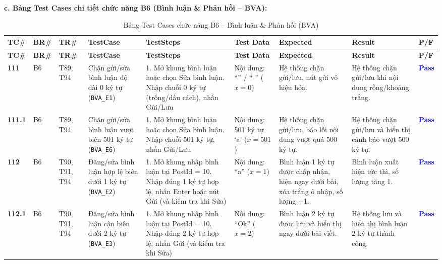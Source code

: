 \documentclass[11pt,a4paper]{article}
\begin{document}
\noindent\textbf{c. Bảng Test Cases chi tiết chức năng B6 (Bình luận \& Phản hồi -- BVA):}
\begingroup
\scriptsize
\setlength{\tabcolsep}{3pt}
\begin{longtable}{|C{0.9cm}|C{0.7cm}|C{0.9cm}|L{2.0cm}|L{3.0cm}|L{2.25cm}|L{2.6cm}|L{2.5cm}|C{0.85cm}|}
\hline
{}
\textbf{TC\#} & \textbf{BR\#} & \textbf{TR\#} & \textbf{TestCase} & \textbf{TestSteps} & \textbf{Test Data} & \textbf{Expected} & \textbf{Result} & \textbf{P/F} \tabularnewline
\hline
\endfirsthead
\hline
{}
\textbf{TC\#} & \textbf{BR\#} & \textbf{TR\#} & \textbf{TestCase} & \textbf{TestSteps} & \textbf{Test Data} & \textbf{Expected} & \textbf{Result} & \textbf{P/F} \tabularnewline
\hline
\endhead
\hline
\endfoot
\hline
\caption{Bảng Test Cases chức năng B6 -- Bình luận \& Phản hồi (BVA)}
\endlastfoot
\textbf{111} & B6 & T89, T94 & Chặn gửi/sửa bình luận độ dài 0 ký tự (\texttt{BVA\_E1}) & 1. Mở khung bình luận hoặc chọn Sửa bình luận. Nhập chuỗi 0 ký tự (trống/dấu cách), nhấn Gửi/Lưu & Nội dung: ``'' / ``   '' ($x = 0$) & Hệ thống chặn gửi/lưu, nút gửi vô hiệu hóa. & Hệ thống chặn gửi/lưu khi nội dung rỗng/khoảng trắng. & \textcolor{blue}{\textbf{Pass}} \\ \hline
\textbf{111.1} & B6 & T89, T94 & Chặn gửi/sửa bình luận vượt biên 501 ký tự (\texttt{BVA\_E6}) & 1. Mở khung bình luận hoặc chọn Sửa bình luận. Nhập chuỗi 501 ký tự, nhấn Gửi/Lưu & Nội dung: 501 ký tự `a' ($x = 501$) & Hệ thống chặn gửi/lưu, báo lỗi nội dung vượt quá 500 ký tự. & Hệ thống chặn gửi/lưu và hiển thị cảnh báo vượt 500 ký tự. & \textcolor{blue}{\textbf{Pass}} \\ \hline
\textbf{112} & B6 & T90, T91, T94 & Đăng/sửa bình luận hợp lệ biên dưới 1 ký tự (\texttt{BVA\_E2}) & 1. Mở khung nhập bình luận tại PostId = 10. Nhập đúng 1 ký tự hợp lệ, nhấn Enter hoặc nút Gửi (và kiểm tra khi Sửa) & Nội dung: ``a'' ($x = 1$) & Bình luận 1 ký tự được chấp nhận, hiện ngay dưới bài, xóa trắng ô nhập, số lượng +1. & Bình luận xuất hiện tức thì, số lượng tăng 1. & \textcolor{blue}{\textbf{Pass}} \\ \hline
\textbf{112.1} & B6 & T90, T91, T94 & Đăng/sửa bình luận cận biên dưới 2 ký tự (\texttt{BVA\_E3}) & 1. Mở khung nhập bình luận tại PostId = 10. Nhập đúng 2 ký tự hợp lệ, nhấn Gửi (và kiểm tra khi Sửa) & Nội dung: ``Ok'' ($x = 2$) & Bình luận 2 ký tự được lưu và hiển thị ngay dưới bài viết. & Hệ thống lưu và hiển thị bình luận 2 ký tự thành công. & \textcolor{blue}{\textbf{Pass}} \\ \hline

\end{longtable}
\end{document}

